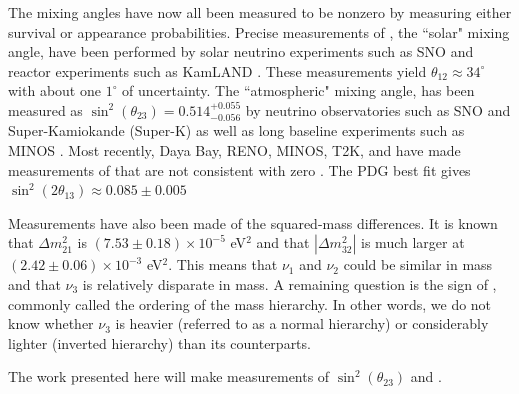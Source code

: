 The mixing angles have now all been measured to be nonzero by measuring either
survival or appearance probabilities.
Precise measurements of \thetaot, the ``solar" mixing angle, have been
performed by solar neutrino experiments such as SNO and reactor experiments
such as KamLAND \cite{sno, kamland, pdg}.
 These measurements yield $\theta_{12} \approx 34^\circ$ with about one
 $1^\circ$ of uncertainty.
The ``atmospheric" mixing angle, \thetatth has been measured as
$\sin^2(\theta_{23}) =  0.514^{+0.055}_{-0.056}$ by neutrino observatories
such as SNO and Super-Kamiokande (Super-K) as well as long baseline
experiments such as MINOS \cite{sno, superK, minos, pdg}.
Most recently, Daya Bay, RENO, MINOS, T2K, and \nova have made measurements of
\thetaoth that are not consistent with zero
\cite{dayaBay, reno, minos13,abe2014observation}.
The PDG best fit gives $\sin^2(2 \theta_{13}) \approx 0.085 \pm 0.005$

Measurements have also been made of the squared-mass differences.
It is known that $\Delta m_{21}^2$ is $(7.53 \pm 0.18) \times 10^{-5}$ eV${}^2$
and that $|\Delta m_{32}^2|$ is much larger at $(2.42 \pm 0.06) \times10^{-3}$
eV${^2}$.
This means that $\nu_1$ and $\nu_2$ could be similar in mass and that $\nu_3$
is relatively disparate in mass.
A remaining question is the sign of \deltamtht, commonly called the ordering of
the mass hierarchy.
In other words, we do not know whether $\nu_3$ is heavier (referred to as a
normal hierarchy) or considerably lighter (inverted hierarchy) than its
counterparts.

The work presented here will make measurements of $\sin^2(\theta_{23})$ and
\deltamtht.


